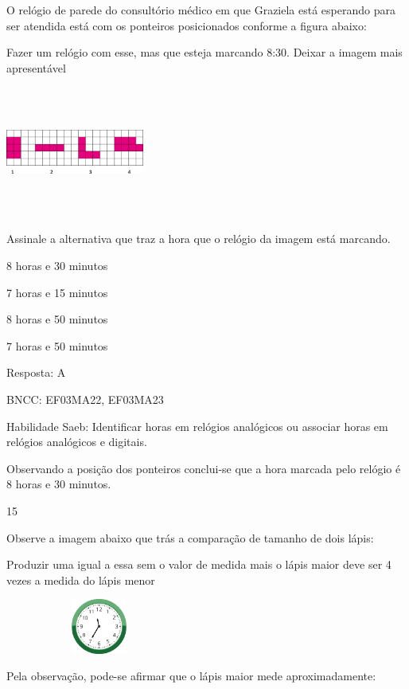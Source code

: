 \begin{escolha}
O relógio de parede do consultório médico em que Graziela está esperando
para ser atendida está com os ponteiros posicionados conforme a figura
abaixo:

Fazer um relógio com esse, mas que esteja marcando 8:30. Deixar a imagem
mais apresentável

\includegraphics[width=1.79182in,height=1.69181in]{media/image115.png}

Assinale a alternativa que traz a hora que o relógio da imagem está
marcando.

\begin{escolha}
\item
  8 horas e 30 minutos
\item
  7 horas e 15 minutos
\item
  8 horas e 50 minutos
\item
  7 horas e 50 minutos
\end{escolha}

Resposta: A

BNCC: EF03MA22, EF03MA23

Habilidade Saeb: Identificar horas em relógios analógicos ou associar
horas em relógios analógicos e digitais.

Observando a posição dos ponteiros conclui-se que a hora marcada pelo
relógio é 8 horas e 30 minutos.

\num{15}

Observe a imagem abaixo que trás a comparação de tamanho de dois lápis:

Produzir uma igual a essa sem o valor de medida mais o lápis maior deve
ser 4 vezes a medida do lápis menor

\includegraphics[width=2.43137in,height=0.71356in]{media/image116.png}

Pela observação, pode-se afirmar que o lápis maior mede aproximadamente:


\end{escolha}
